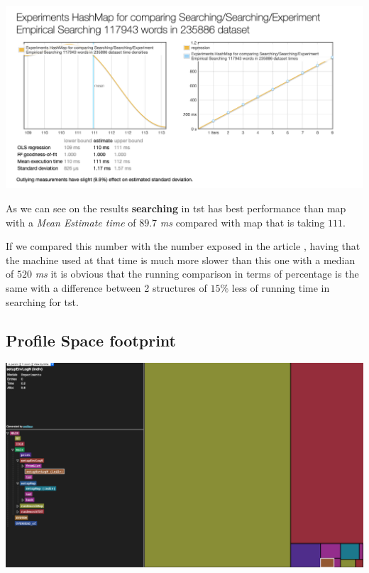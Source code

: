 \documentclass[12pt, a4paper]{article}
\begin{document}
\begin{minipage}[t]{\linewidth}
  \includegraphics[width=\textwidth]{map_bench}
  \captionsetup{type=figure}
  \label{fig:map_bench}
\end{minipage}

As we can see on the results \textbf{searching} in \acrshort{tst} has best performance than \acrshort{map} with a \textit{Mean Estimate time} of $89.7$ \textit{ms} compared with \acrshort{map} that is taking $111$.

If we compared this number with the number exposed in the article \cite{cs_tst}, having that the machine used at that time is much more slower than this one with a median of $520$ \textit{ms} it is obvious that the running comparison in terms of percentage is the same with a difference between 2 structures of $15\%$ less of running time in searching for \acrshort{tst}.

\subsection{Profile Space footprint}\label{sub:sec:qual:results}

\begin{minipage}[t]{\linewidth}
  \includegraphics[width=\textwidth]{alloc_tst}
  \captionsetup{type=figure}
  \label{fig:alloc_tst}
\end{minipage}
\end{document}
